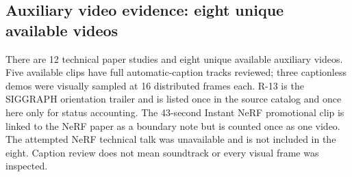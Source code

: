 \subsection{Auxiliary video evidence: eight unique available videos}\label{04-visual-computing-ii-ch036-auxiliary-video-evidence-eight-unique-available-videos}

\hypertarget{04-visual-computing-ii-ch036-auxiliary-video-evidence-eight-unique-available-videos}{}

There are 12 technical paper studies and eight unique available auxiliary videos. Five available clips have full automatic-caption tracks reviewed; three captionless demos were visually sampled at 16 distributed frames each. R-13 is the SIGGRAPH orientation trailer and is listed once in the source catalog and once here only for status accounting. The 43-second Instant NeRF promotional clip is linked to the NeRF paper as a boundary note but is counted once as one video. The attempted NeRF technical talk  was unavailable and is not included in the eight. Caption review does not mean soundtrack or every visual frame was inspected.

